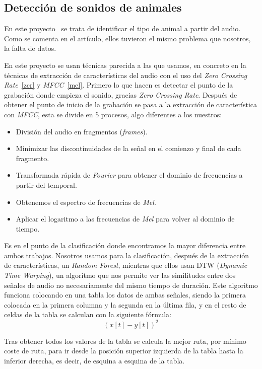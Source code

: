 \subsection{Detección de sonidos de animales}
En este proyecto~\cite{yeo2011animal} se trata de identificar el tipo de animal a partir del audio. Como se comenta en el artículo, ellos tuvieron el mismo problema que nosotros, la falta de datos.

En este proyecto se usan técnicas parecida a las que usamos, en concreto en la técnicas de extracción de características del audio con el uso del \textit{Zero Crossing Rate}~\ref{zcr} y \textit{MFCC}~\ref{mel}. Primero lo que hacen es detectar el punto de la grabación donde empieza el sonido, gracias \textit{Zero Crossing Rate}. Después de obtener el punto de inicio de la grabación se pasa a la extracción de característica con \textit{MFCC}, esta se divide en 5 procesos, algo diferentes a los nuestros:
\begin{itemize}
	\item División del audio en fragmentos (\textit{frames}).
	\item Minimizar las discontinuidades de la señal en el comienzo y final de cada fragmento.
	\item Transformada rápida de \textit{Fourier} para obtener el dominio de frecuencias a partir del temporal.
	\item Obtenemos el espectro de frecuencias de \textit{Mel}.
	\item Aplicar el logaritmo a las frecuencias de \textit{Mel} para volver al dominio de tiempo.
\end{itemize}

Es en el punto de la clasificación donde encontramos la mayor diferencia entre ambos trabajos. Nosotros usamos para la clasificación, después de la extracción de características, un \textit{Random Forest}, mientras que ellos usan DTW (\textit{Dynamic Time Warping}), un algoritmo que nos permite ver las similitudes entre dos señales de audio no necesariamente del mismo tiempo de duración. Este algoritmo funciona colocando en una tabla los datos de ambas señales, siendo la primera colocada en la primera columna y la segunda en la última fila, y en el resto de celdas de la tabla se calculan con la siguiente fórmula:\[(x[t]-y[t])^2\]

Tras obtener todos los valores de la tabla se calcula la mejor ruta, por mínimo coste de ruta, para ir desde la posición superior izquierda de la tabla hasta la inferior derecha, es decir, de esquina a esquina de la tabla.

